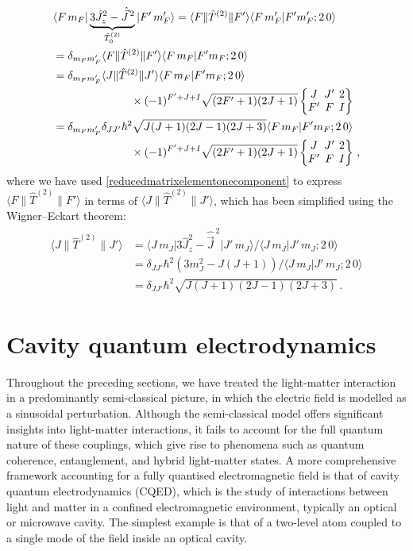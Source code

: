 \documentclass[../Thesis-IJspeert.tex]{subfiles}
\begin{document}
\begin{align}
\begin{split}
&\langle F\,m_F \vert \underbrace{3{\hat{J}}_z^2-\hat{\vec{J}}^{\,2}}_{\hat{T}^{(2)}_0}  \vert F'\, m'_F \rangle = \langle F \| \hat{T}^{(2)} \| F' \rangle \langle F\, m'_F \vert F' m'_F; 2\, 0 \rangle \\ & =\delta_{m_F m'_F} \langle F \| \hat{T}^{(2)} \| F' \rangle \langle F\, m_F \vert F' m_F; 2\, 0 \rangle \\ & =\delta_{m_F m'_F} \langle J \| \hat{T}^{(2)} \| J' \rangle \langle F\, m_F \vert F' m_F; 2\, 0 \rangle \\ &\hspace{7em}\times (-1)^{F'+J+I} \sqrt{(2F'+1)(2J+1)} \tj{J}{J'}{2}{F'}{F}{I}  \\ &= \delta_{m_F m'_F} \delta_{JJ'} \hbar^2 \sqrt{J(J+1)(2J-1)(2J+3)} \langle F\, m_F \vert F' m_F; 2\, 0 \rangle \\ &\hspace{7em}\times(-1)^{F'+J+I} \sqrt{(2F'+1)(2J+1)} \tj{J}{J'}{2}{F'}{F}{I}  \,,
\end{split}
\end{align}
where we have used \autoref{reducedmatrixelementonecomponent} to express $\langle F \| \hat{T}^{(2)} \| F' \rangle$ in terms of $\langle J \| \hat{T}^{(2)} \| J' \rangle$, which has been simplified using the Wigner--Eckart theorem:
\begin{align}
\begin{split}
\langle J \| \hat{T}^{(2)} \| J' \rangle &= \langle J\, m_J \vert 3{\hat{J}}_z^2-\hat{\vec{J}}^{\,2} \vert J' \, m_J \rangle \Big/ \langle J\, m_J \vert J'\, m_J; 2\, 0 \rangle \\ &= \delta_{JJ'}\hbar^2 (3m_J^2-J(J+1)) \Big/ \langle J\, m_J \vert J'\, m_J; 2\, 0 \rangle \\ &= \delta_{JJ'}\hbar^2 \sqrt{J(J+1)(2J-1)(2J+3)} \,.
\end{split}
\end{align}

\section{Cavity quantum electrodynamics}
\label{cqed}
Throughout the preceding sections, we have treated the light-matter interaction in a predominantly semi-classical picture, in which the electric field is modelled as a sinusoidal perturbation. Although the semi-classical model offers significant insights into light-matter interactions, it fails to account for the full quantum nature of these couplings, which give rise to phenomena such as quantum coherence, entanglement, and hybrid light-matter states. A more comprehensive framework accounting for a fully quantised electromagnetic field is that of cavity quantum electrodynamics (CQED), which is the study of interactions between light and matter in a confined electromagnetic environment, typically an optical or microwave cavity. The simplest example is that of a two-level atom coupled to a single mode of the field inside an optical cavity.
\end{document}
